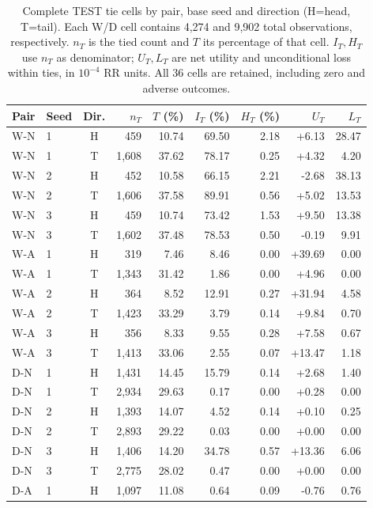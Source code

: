 \begin{table}[htbp]
\centering\footnotesize\setlength{\tabcolsep}{3pt}
\caption{Complete TEST tie cells by pair, base seed and direction (H=head, T=tail). Each W/D cell contains 4,274 and 9,902 total observations, respectively. $n_T$ is the tied count and $T$ its percentage of that cell. $I_T,H_T$ use $n_T$ as denominator; $U_T,L_T$ are net utility and unconditional loss within ties, in $10^{-4}$ RR units. All 36 cells are retained, including zero and adverse outcomes.}
\label{tab:ties-test}
\begin{tabular}{llcrrrrrr}
\toprule
Pair & Seed & Dir. & $n_T$ & $T$ (\%) & $I_T$ (\%) & $H_T$ (\%) & $U_T$ & $L_T$\\
\midrule
W-N & 1 & H & 459 & 10.74 & 69.50 & 2.18 & +6.13 & 28.47\\
W-N & 1 & T & 1,608 & 37.62 & 78.17 & 0.25 & +4.32 & 4.20\\
W-N & 2 & H & 452 & 10.58 & 66.15 & 2.21 & -2.68 & 38.13\\
W-N & 2 & T & 1,606 & 37.58 & 89.91 & 0.56 & +5.02 & 13.53\\
W-N & 3 & H & 459 & 10.74 & 73.42 & 1.53 & +9.50 & 13.38\\
W-N & 3 & T & 1,602 & 37.48 & 78.53 & 0.50 & -0.19 & 9.91\\
W-A & 1 & H & 319 & 7.46 & 8.46 & 0.00 & +39.69 & 0.00\\
W-A & 1 & T & 1,343 & 31.42 & 1.86 & 0.00 & +4.96 & 0.00\\
W-A & 2 & H & 364 & 8.52 & 12.91 & 0.27 & +31.94 & 4.58\\
W-A & 2 & T & 1,423 & 33.29 & 3.79 & 0.14 & +9.84 & 0.70\\
W-A & 3 & H & 356 & 8.33 & 9.55 & 0.28 & +7.58 & 0.67\\
W-A & 3 & T & 1,413 & 33.06 & 2.55 & 0.07 & +13.47 & 1.18\\
D-N & 1 & H & 1,431 & 14.45 & 15.79 & 0.14 & +2.68 & 1.40\\
D-N & 1 & T & 2,934 & 29.63 & 0.17 & 0.00 & +0.28 & 0.00\\
D-N & 2 & H & 1,393 & 14.07 & 4.52 & 0.14 & +0.10 & 0.25\\
D-N & 2 & T & 2,893 & 29.22 & 0.03 & 0.00 & +0.00 & 0.00\\
D-N & 3 & H & 1,406 & 14.20 & 34.78 & 0.57 & +13.36 & 6.06\\
D-N & 3 & T & 2,775 & 28.02 & 0.47 & 0.00 & +0.00 & 0.00\\
D-A & 1 & H & 1,097 & 11.08 & 0.64 & 0.09 & -0.76 & 0.76\\

\end{tabular}
\end{table}
